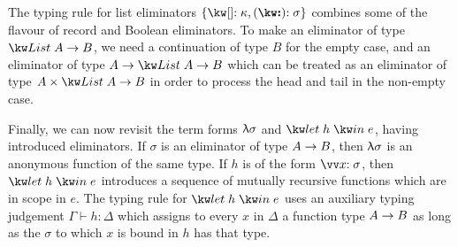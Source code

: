 The typing rule for list eliminators $\elimList{\kappa}{\sigma}$ combines some of the flavour of record and Boolean eliminators. To make an eliminator of type $\tyFun{\tyList{A}}{B}$, we need a continuation of type $B$ for the empty case, and an eliminator of type $\tyFun{A}{\tyFun{\tyList{A}}{B}}$ which can be treated as an eliminator of type $\tyFun{\tyProd{A}{\tyList{A}}}{B}$ in order to process the head and tail in the non-empty case.


Finally, we can now revisit the term forms $\uplambda{\sigma}$ and $\exLetRecMutual{h}{e}$, having introduced eliminators. If $\sigma$ is an eliminator of type ${A}\rightarrow{B}$, then $\uplambda{\sigma}$ is an anonymous function of the same type. If $h$ is of the form $\vec{\bind{x}{\sigma}}$, then $\exLetRecMutual{h}{e}$ introduces a sequence of mutually recursive functions which are in scope in $e$. The typing rule for $\exLetRecMutual{h}{e}$ uses an auxiliary typing judgement $\Gamma \vdash h : \Delta$ which assigns to every $x$ in $\Delta$ a function type ${A}\rightarrow{B}$ as long as the $\sigma$ to which $x$ is bound in $h$ has that type.





